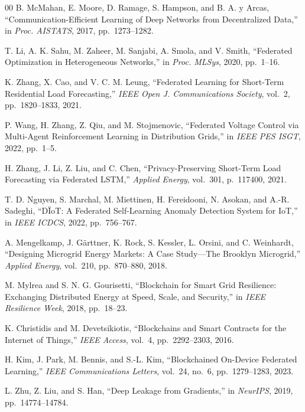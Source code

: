 \documentclass[journal]{IEEEtran}
\begin{document}
\begin{thebibliography}{00}
 B. McMahan, E. Moore, D. Ramage, S. Hampson, and B. A. y Arcas, ``Communication-Efficient Learning of Deep Networks from Decentralized Data,'' in \textit{Proc. AISTATS}, 2017, pp.~1273--1282.

 T. Li, A. K. Sahu, M. Zaheer, M. Sanjabi, A. Smola, and V. Smith, ``Federated Optimization in Heterogeneous Networks,'' in \textit{Proc. MLSys}, 2020, pp.~1--16.

 K. Zhang, X. Cao, and V. C. M. Leung, ``Federated Learning for Short-Term Residential Load Forecasting,'' \textit{IEEE Open J. Communications Society}, vol.~2, pp.~1820--1833, 2021.

 P. Wang, H. Zhang, Z. Qiu, and M. Stojmenovic, ``Federated Voltage Control via Multi-Agent Reinforcement Learning in Distribution Grids,'' in \textit{IEEE PES ISGT}, 2022, pp.~1--5.

 H. Zhang, J. Li, Z. Liu, and C. Chen, ``Privacy-Preserving Short-Term Load Forecasting via Federated LSTM,'' \textit{Applied Energy}, vol.~301, p.~117400, 2021.

 T. D. Nguyen, S. Marchal, M. Miettinen, H. Fereidooni, N. Asokan, and A.-R. Sadeghi, ``DÏoT: A Federated Self-Learning Anomaly Detection System for IoT,'' in \textit{IEEE ICDCS}, 2022, pp.~756--767.

 A. Mengelkamp, J. G\"{a}rttner, K. Rock, S. Kessler, L. Orsini, and C. Weinhardt, ``Designing Microgrid Energy Markets: A Case Study—The Brooklyn Microgrid,'' \textit{Applied Energy}, vol.~210, pp.~870--880, 2018.

 M. Mylrea and S. N. G. Gourisetti, ``Blockchain for Smart Grid Resilience: Exchanging Distributed Energy at Speed, Scale, and Security,'' in \textit{IEEE Resilience Week}, 2018, pp.~18--23.

 K. Christidis and M. Devetsikiotis, ``Blockchains and Smart Contracts for the Internet of Things,'' \textit{IEEE Access}, vol.~4, pp.~2292--2303, 2016.

 H. Kim, J. Park, M. Bennis, and S.-L. Kim, ``Blockchained On-Device Federated Learning,'' \textit{IEEE Communications Letters}, vol.~24, no.~6, pp.~1279--1283, 2023.

 L. Zhu, Z. Liu, and S. Han, ``Deep Leakage from Gradients,'' in \textit{NeurIPS}, 2019, pp.~14774--14784.


\end{thebibliography}
\end{document}
